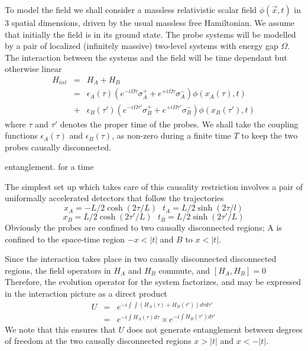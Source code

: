 \documentclass[12pt]{article}
\newcommand{\beq}{\begin{equation}}
\newcommand{\eeq}{\end{equation}}
\newcommand{\beqa}{\begin{eqnarray}}
\newcommand{\eeqa}{\end{eqnarray}}
\begin{document}
To model the field we shall consider a massless relativistic
scalar field $\phi(\vec x,t)$ in 3 spatial dimensions, driven by
the usual massless free Hamiltonian. We assume that initially the
field is in its ground state. The probe systems will be modelled
by a pair of localized (infinitely massive) two-level systems with
energy gap $\Omega$. The interaction between the systems and the
field will be time dependant but otherwise linear \beqa
H_{int} &=& H_A + H_B \nonumber \\
&=&\epsilon_A(\tau)(e^{-i\Omega \tau}\sigma_A^+ +e^{+i\Omega \tau}
\sigma_A^-)\phi(x_A(\tau),t)
\nonumber \\
&+& \epsilon_B(\tau')(e^{-i\Omega \tau'}\sigma_B^+ + e^{+i\Omega
\tau'}
\sigma^-_B)\phi(x_B(\tau'),t)
\eeqa
where $\tau$ and $\tau'$ denotes the proper time of the probes.
We shall take the coupling functions $\epsilon_A(\tau)$ and
$\epsilon_B(\tau)$,
as non-zero during a finite time $T$ to keep the two probes
causally
disconnected.

entanglement.
for a time


The simplest set up which takes care of this causality restriction
involves a pair of uniformally accelerated detectors that follow
the trajectories
\beq
x_A = -L/2\cosh (2\tau/L) \ \ \
t_A = L/2\sinh(2\tau/l)
\eeq
\beq
x_B= L/2 \cosh(2\tau'/L) \ \ \
t_B= L/2 \sinh(2\tau'/L)
\eeq
Obviously the probes are confined to two causally
disconnected regions; A is confined to the space-time region
 $-x< |t|$ and $B$ to $x<|t|$.



Since the interaction takes place in two
causally disconnected disconnected regions, the field
operators in $H_A$ and $H_B$ commute, and $[H_A, H_{B}]=0$
Therefore, the evolution operator for the system factorizes,
and may be expressed in the interaction
picture as a direct product
\beqa
U  &=&  e^{-i\int\int (H_A(\tau)+H_B(\tau')) d\tau d\tau'}
\nonumber \\
&=& e^{-i\int H_A(\tau) d\tau } \times e^{-i\int H_B(\tau')
d\tau'}
\eeqa
We note that this ensures that $U$
does not generate entanglement between degrees of freedom at
the two causally disconnected regions $x>|t|$ and $x<-|t|$.
\end{document}
